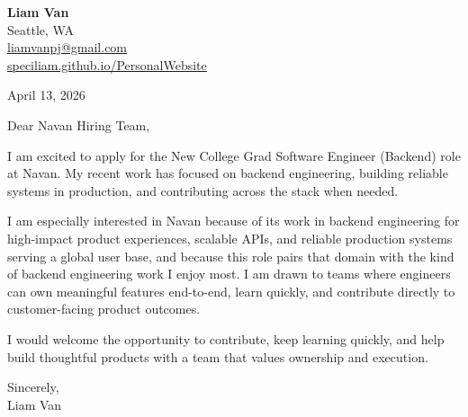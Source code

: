 \documentclass[letterpaper,11pt]{article}
\begin{document}
\begin{flushleft}
\textbf{\Large Liam Van} \\
Seattle, WA \\
\href{mailto:liamvanpj@gmail.com}{liamvanpj@gmail.com} \\
\href{https://speciliam.github.io/PersonalWebsite}{speciliam.github.io/PersonalWebsite}
\end{flushleft}

April 13, 2026

\noindent Dear Navan Hiring Team,

\noindent I am excited to apply for the New College Grad Software Engineer (Backend) role at Navan. My recent work has focused on backend engineering, building reliable systems in production, and contributing across the stack when needed.

\noindent I am especially interested in Navan because of its work in backend engineering for high-impact product experiences, scalable APIs, and reliable production systems serving a global user base, and because this role pairs that domain with the kind of backend engineering work I enjoy most. I am drawn to teams where engineers can own meaningful features end-to-end, learn quickly, and contribute directly to customer-facing product outcomes.

\noindent I would welcome the opportunity to contribute, keep learning quickly, and help build thoughtful products with a team that values ownership and execution.

\noindent Sincerely, \\
Liam Van
\end{document}
